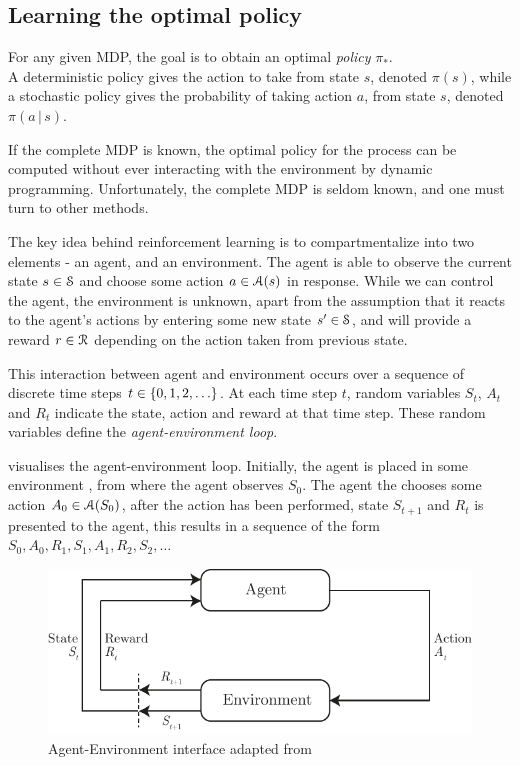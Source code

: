 \subsection{Learning the optimal policy}

For any given MDP, the goal is to obtain an optimal \emph{policy} $\pi_*$.\\
A deterministic policy gives the action to take from state $s$, denoted $\pi(s)$, while a stochastic policy gives the probability of taking action $a$, from state $s$, denoted $\pi(a\,|\,s)$.

If the complete MDP is known, the optimal policy for the process can be computed without ever interacting with the environment by dynamic programming. 
Unfortunately, the complete MDP is seldom known, and one must turn to other methods. 

The key idea behind reinforcement learning is to compartmentalize into two elements - an agent, and an environment. 
The agent is able to observe the current state $s \in \mathcal{S}$ and choose some action $a \in \mathcal{A}(s)$ in response.
While we can control the agent, the environment is unknown, apart from the assumption that it reacts to the agent's actions by entering some new state $s' \in \mathcal{S}$, and will provide a reward $r\in \mathcal{R}$ depending on the action taken from previous state.

This interaction between agent and environment occurs over a sequence of discrete time steps $t \in \left\{0, 1, 2, \ldots\right\}$. At each time step $t$, random variables $S_t$, $A_t$ and $R_t$ indicate the state, action and reward at that time step. These random variables define the \emph{agent-environment loop}.

 visualises the agent-environment loop. 
Initially, the agent is placed in some environment , from where the agent observes $S_0$.
The agent the chooses some action $A_0 \in \mathcal{A}(S_0)$, after the action has been performed, state $S_{t+1}$ and $R_t$ is presented to the agent, this results in a sequence of the form $S_0,A_0,R_1,S_1,A_1,R_2,S_2,\ldots$

\begin{figure}[!htb]
    \centering
    \includegraphics[scale=1]{../include/agent-environment-loop.pdf}
    \caption{Agent-Environment interface adapted from \citet[chap. 3]{RLBook2018}}
    \label{fig:agent-environment}
\end{figure}


